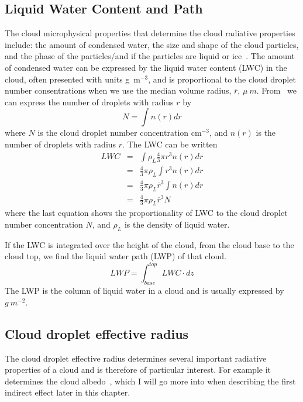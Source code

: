 \subsection{Liquid Water Content and Path}
The cloud microphysical properties that determine the cloud radiative properties include: the amount of condensed water, the size and shape of the cloud particles, and the phase of the particles/and if the particles are liquid or ice~\citep{Curry1996}. The amount of condensed water can be expressed by the liquid water content (LWC) in the cloud, often presented with units g~m$^{-3}$, and is proportional to the cloud droplet number consentrations when we use the median volume radius, $\overline{r}$, $\mu~m$. From~\citet{Rogers1989} we can express the number of droplets with radius $r$ by
\begin{equation}
N = \int n(r) dr
\end{equation}
where $N$ is the cloud droplet number concentration cm$^{-3}$, and $n(r)$ is the number of droplets with radius $r$.
The LWC can be written
\begin{eqnarray}
LWC &=& \int \rho_L \frac{4}{3} \pi r^3 n(r) dr\\
&=& \frac{4}{3} \pi \rho_L \int r^3 n(r) dr\\
&=& \frac{4}{3} \pi \rho_L \overline{r}^3 \int n(r) dr\\
&=& \frac{4}{3} \pi \rho_L \overline{r}^3 N 
\end{eqnarray}
where the last equation shows the proportionality of LWC to the cloud droplet number concentration $N$, and $\rho_L$ is the density of liquid water.

If the LWC is integrated over the height of the cloud, from the cloud base to the cloud top, we find the liquid water path (LWP) of that cloud.
\begin{equation}
LWP = \int_{base}^{top} LWC \cdot dz
\end{equation}
The LWP is the column of liquid water in a cloud and is usually expressed by $g~m^{-2}$.

\subsection{Cloud droplet effective radius}
The cloud droplet effective radius determines several important radiative properties of a cloud and is therefore of particular interest. For example it determines the cloud albedo~\citep{Hansen1974}, which I will go more into when describing the first indirect effect later in this chapter.

